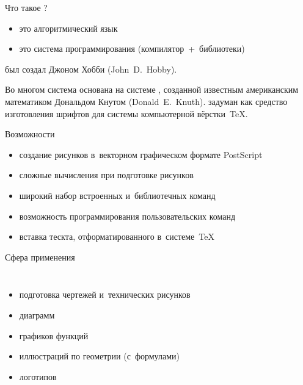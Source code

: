 

\begin{frame}{Что такое ?}
\begin{itemize}
\item
это алгоритмический язык
\item
это система программирования (компилятор~+~библиотеки)
\end{itemize}

 был создал Джоном Хобби (John~D.~Hobby).

Во многом система  основана на системе ,
созданной известным американским математиком Дональдом Кнутом
(Donald~E.~Knuth).  задуман как средство изготовления шрифтов
для системы компьютерной вёрстки \TeX.
\end{frame}


\begin{frame}{Возможности }

\begin{itemize}
\item
создание рисунков в~векторном графическом формате PostScript
\item
сложные вычисления при подготовке рисунков
\item
широкий набор встроенных и~библиотечных команд
\item
возможность программирования пользовательских команд
\item
вставка тескта, отформатированного в~системе~\TeX
\end{itemize}
\end{frame}


\begin{frame}{Сфера применения }
\begin{columns}
\begin{itemize}
\item
\alert<1>{подготовка чертежей и~технических рисунков}
\item
\alert<2>{диаграмм}
\item
\alert<3>{графиков функций}
\item
\alert<4>{иллюстраций по геометрии (с~формулами)}
\item
\alert<5>{логотипов}
\end{itemize}

\end{columns}
\end{frame}

